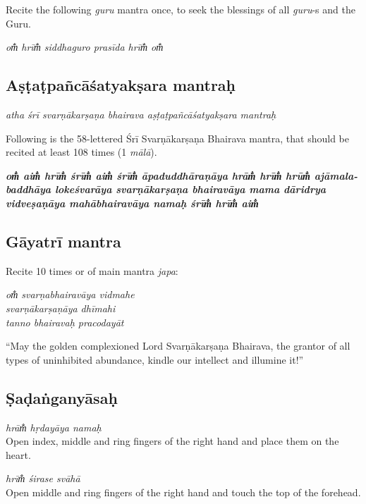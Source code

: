 \documentclass[12pt,oneside,a4paper]{article}
\newenvironment{shloka}[1]
  {\bigskip\center#1\varwidth{\linewidth}}
  {\endvarwidth\endcenter\bigskip}
\newcommand{\tl}[1]{\emph{#1}}
\begin{document}
Recite the following \tl{guru} mantra once, to seek the blessings of all
\tl{guru}-s and the Guru.

\begin{shloka}\itshape
  om̐ hrīm̐ siddhaguro prasīda hrīm̐ om̐
\end{shloka}

\subsection{Aṣṭaṭpañcāśatyakṣara mantraḥ}

\begin{shloka}\itshape
  atha śrī svarṇākarṣaṇa bhairava aṣṭaṭpañcāśatyakṣara mantraḥ
\end{shloka}

Following is the 58-lettered Śrī Svarṇākarṣaṇa Bhairava mantra, that should be
recited at least 108 times (1 \tl{mālā}).

\begin{shloka}\itshape\bfseries
  om̐ aim̐ hrīm̐ śrīm̐ aim̐ śrīm̐ āpaduddhāraṇāya hrām̐ hrīm̐ hrūm̐ ajāmala-baddhāya
  lokeśvarāya svarṇākarṣaṇa bhairavāya mama dāridrya vidveṣaṇāya
  mahābhairavāya namaḥ śrīm̐ hrīm̐ aim̐
\end{shloka}

\subsection{Gāyatrī mantra}

Recite 10 times or  of main mantra \tl{japa}:

\begin{shloka}\itshape
  om̐ svarṇabhairavāya vidmahe\\
  svarṇākarṣaṇāya dhīmahi\\
  tanno bhairavaḥ pracodayāt
\end{shloka}

``May the golden complexioned Lord Svarṇākarṣaṇa Bhairava, the grantor of all
types of uninhibited abundance, kindle our intellect and illumine it!''

\subsection{Ṣaḍaṅganyāsaḥ}

\tl{hrām̐ hṛdayāya namaḥ}\\
Open index, middle and ring fingers of the right hand and place them on
the heart.

\tl{hrīm̐ śirase svāhā}\\
Open middle and ring fingers of the right hand and touch the top of the forehead.
\end{document}
